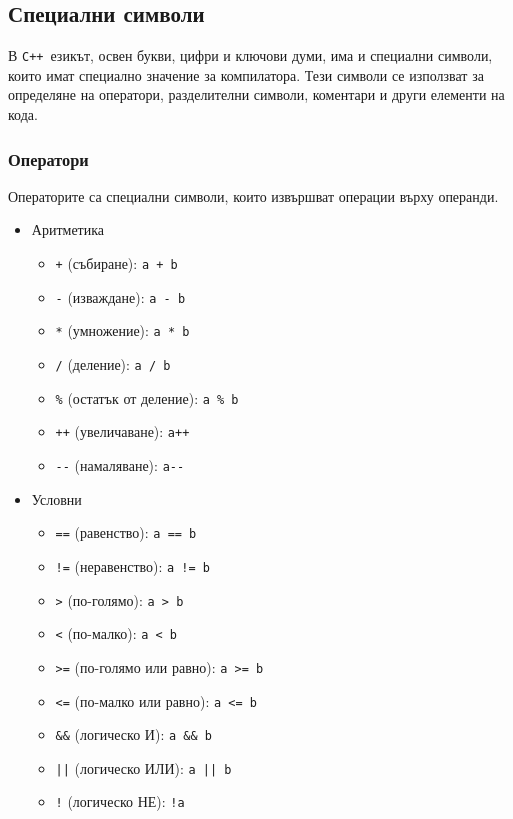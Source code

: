 \documentclass[oneside]{book}
\newcommand*{\code}[1]{\texttt{#1}}
\newcommand*{\cpp}{\texttt{C++}\ }
\begin{document}
\subsection{Специални символи}
В \cpp езикът, освен букви, цифри и ключови думи, има и специални символи, които имат специално значение за компилатора. Тези символи се използват за определяне на оператори, разделителни символи, коментари и други елементи на кода.

\subsubsection{Оператори}
Операторите са специални символи, които извършват операции върху операнди.

\begin{itemize}
    \centering
    \item[] Аритметика
    \begin{itemize}
        \item[] \code{+} (събиране): \code{a + b}
        \item[] \code{-} (изваждане): \code{a - b}
        \item[] \code{*} (умножение): \code{a * b}
        \item[] \code{/} (деление): \code{a / b}
        \item[] \code{\%} (остатък от деление): \code{a \% b}
        \item[] \code{++} (увеличаване): \code{a++}
        \item[] \code{-}\code{-} (намаляване): \code{a-}\code{-}
    \end{itemize}
    \item[] Условни
    \begin{itemize}
        \item[] \code{==} (равенство): \code{a == b}
        \item[] \code{!=} (неравенство): \code{a != b}
        \item[] \code{>} (по-голямо): \code{a > b}
        \item[] \code{<} (по-малко): \code{a < b}
        \item[] \code{>=} (по-голямо или равно): \code{a >= b}
        \item[] \code{<=} (по-малко или равно): \code{a <= b}
        \item[] \code{\&\&} (логическо И): \code{a \&\& b}
        \item[] \code{||} (логическо ИЛИ): \code{a || b}
        \item[] \code{!} (логическо НЕ): \code{!a}

\end{itemize}
\end{itemize}
\end{document}
